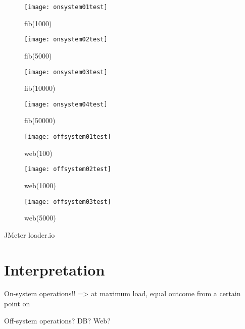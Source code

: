 \begin{figure}
\centering\small
\setlength{\tabcolsep}{0mm}
  \texttt{[image: onsystem01test]}
\caption{fib(1000)
}
\label{fig:response_time} 
\end{figure}

\begin{figure}
\centering\small
\setlength{\tabcolsep}{0mm}
  \texttt{[image: onsystem02test]} 
\caption{fib(5000)
}
\label{fig:response_time} 
\end{figure}

\begin{figure}
\centering\small
\setlength{\tabcolsep}{0mm}
  \texttt{[image: onsystem03test]}
\caption{fib(10000)
}
\label{fig:response_time} 
\end{figure}

\begin{figure}
\centering\small
\setlength{\tabcolsep}{0mm}
  \texttt{[image: onsystem04test]}
\caption{fib(50000)
}
\label{fig:response_time} 
\end{figure}

\begin{figure}
\centering\small
\setlength{\tabcolsep}{0mm}
  \texttt{[image: offsystem01test]}
\caption{web(100)
}
\label{fig:response_time} 
\end{figure}

\begin{figure}
\centering\small
\setlength{\tabcolsep}{0mm}
  \texttt{[image: offsystem02test]}
\caption{web(1000)
}
\label{fig:response_time} 
\end{figure}

\begin{figure}
\centering\small
\setlength{\tabcolsep}{0mm}
  \texttt{[image: offsystem03test]}
\caption{web(5000)
}
\label{fig:response_time} 
\end{figure}

JMeter
loader.io

\section{Interpretation}
On-system operations!!
=> at maximum load, equal outcome from a certain point on

Off-system operations? DB? Web?